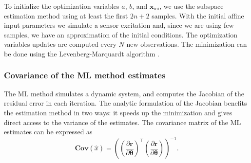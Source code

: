 To initialize the optimization variables $a$, $b$, and $\mathbf{x}_{\text{ini}}$,
we use the subspace estimation method using at least the first $2n+2$ samples.
With the initial affine input parameters we simulate a sensor excitation and, since we are using few samples, we have an approximation of the initial conditions.
The optimization variables updates are computed every $N$ new observations.
The minimization can be done using the Levenberg-Marquardt algorithm \citep{Nocedal06}. 


\subsubsection{Covariance of the ML method estimates}

The ML method simulates a dynamic system, and computes the Jacobian of the residual error in each iteration.
The analytic formulation of the Jacobian benefits the estimation method in two ways: it speeds up the minimization and gives direct access to the variance of the estimates.
The covariance matrix of the ML estimates can be expressed as \citep{Pintelon12Book}
\begin{equation} \mathbf{Cov} \left( \widehat{x} \right) = \left( \left( \dfrac{\partial \mathbf{r} }{ \partial \mathbf{\theta} } \right)^\top \left( \dfrac{\partial \mathbf{r} }{ \partial \mathbf{\theta} } \right) \right)^{-1}. \label{eqn:covOpt} \end{equation}


